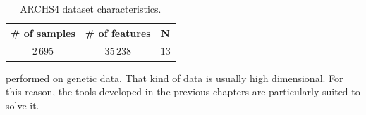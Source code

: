 \begin{table}[!htb]
    \centering
    \setlength{\tabcolsep}{2pt}
    {\small
        \begin{tabular}{|c|c|c|}\hline
        \textbf{\# of samples} & \textbf{\# of features} & \textbf{N}\\ \hline
        $2\,695$ & $35\,238$  & $13$\\ \hline
        \end{tabular}
    }%
    \caption[short]{
        ARCHS4 dataset characteristics.
    }
    \label{tab:archs4_dataset}
\end{table}

performed on genetic data.
That kind of data is usually high dimensional.
For this reason, the tools developed in the previous chapters are particularly suited to solve it.
